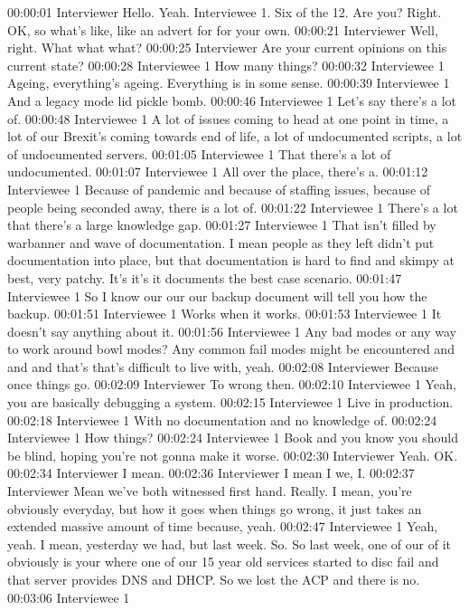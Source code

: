 00:00:01 Interviewer
Hello. Yeah. Interviewee 1. Six of the 12. Are you? Right. OK, so what's like, like an advert for for your own.
00:00:21 Interviewer
Well, right. What what what?
00:00:25 Interviewer
Are your current opinions on this current state?
00:00:28 Interviewee 1
How many things?
00:00:32 Interviewee 1
Ageing, everything's ageing. Everything is in some sense.
00:00:39 Interviewee 1
And a legacy mode lid pickle bomb.
00:00:46 Interviewee 1
Let's say there's a lot of.
00:00:48 Interviewee 1
A lot of issues coming to head at one point in time, a lot of our Brexit's coming towards end of life, a lot of undocumented scripts, a lot of undocumented servers.
00:01:05 Interviewee 1
That there's a lot of undocumented.
00:01:07 Interviewee 1
All over the place, there's a.
00:01:12 Interviewee 1
Because of pandemic and because of staffing issues, because of people being seconded away, there is a lot of.
00:01:22 Interviewee 1
There's a lot that there's a large knowledge gap.
00:01:27 Interviewee 1
That isn't filled by warbanner and wave of documentation. I mean people as they left didn't put documentation into place, but that documentation is hard to find and skimpy at best, very patchy. It's it's it documents the best case scenario.
00:01:47 Interviewee 1
So I know our our our backup document will tell you how the backup.
00:01:51 Interviewee 1
Works when it works.
00:01:53 Interviewee 1
It doesn't say anything about it.
00:01:56 Interviewee 1
Any bad modes or any way to work around bowl modes? Any common fail modes might be encountered and and and that's that's difficult to live with, yeah.
00:02:08 Interviewer
Because once things go.
00:02:09 Interviewer
To wrong then.
00:02:10 Interviewee 1
Yeah, you are basically debugging a system.
00:02:15 Interviewee 1
Live in production.
00:02:18 Interviewee 1
With no documentation and no knowledge of.
00:02:24 Interviewee 1
How things?
00:02:24 Interviewee 1
Book and you know you should be blind, hoping you're not gonna make it worse.
00:02:30 Interviewer
Yeah. OK.
00:02:34 Interviewer
I mean.
00:02:36 Interviewer
I mean I we, I.
00:02:37 Interviewer
Mean we've both witnessed first hand. Really. I mean, you're obviously everyday, but how it goes when things go wrong, it just takes an extended massive amount of time because, yeah.
00:02:47 Interviewee 1
Yeah, yeah. I mean, yesterday we had, but last week. So. So last week, one of our of it obviously is your where one of our 15 year old services started to disc fail and that server provides DNS and DHCP. So we lost the ACP and there is no.
00:03:06 Interviewee 1
